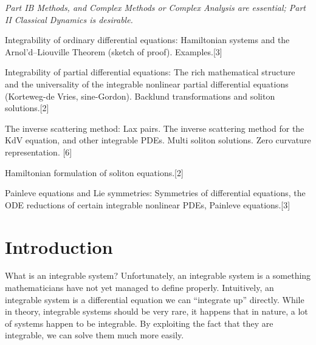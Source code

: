 \documentclass[a4paper]{article}
\begin{document}
\maketitle
{\small
\noindent\emph{Part IB Methods, and Complex Methods or Complex Analysis are essential; Part II Classical Dynamics is desirable.}
\vspace{10pt}


\noindent Integrability of ordinary differential equations: Hamiltonian systems and the Arnol'd--Liouville Theorem (sketch of proof). Examples.\hspace*{\fill}[3]

\vspace{5pt}
\noindent Integrability of partial differential equations: The rich mathematical structure and the universality of the integrable nonlinear partial differential equations (Korteweg-de Vries, sine-Gordon). Backlund transformations and soliton solutions.\hspace*{\fill}[2]

\vspace{5pt}
\noindent The inverse scattering method: Lax pairs. The inverse scattering method for the KdV equation, and other integrable PDEs. Multi soliton solutions. Zero curvature representation. \hspace*{\fill}[6]

\vspace{5pt}
\noindent Hamiltonian formulation of soliton equations.\hspace*{\fill}[2]

\vspace{5pt}
\noindent Painleve equations and Lie symmetries: Symmetries of differential equations, the ODE reductions of certain integrable nonlinear PDEs, Painleve equations.\hspace*{\fill}[3]%
}

\tableofcontents
\setcounter{section}{-1}
\section{Introduction}
What is an integrable system? Unfortunately, an integrable system is a something mathematicians have not yet managed to define properly. Intuitively, an integrable system is a differential equation we can ``integrate up'' directly. While in theory, integrable systems should be very rare, it happens that in nature, a lot of systems happen to be integrable. By exploiting the fact that they are integrable, we can solve them much more easily.
\end{document}
